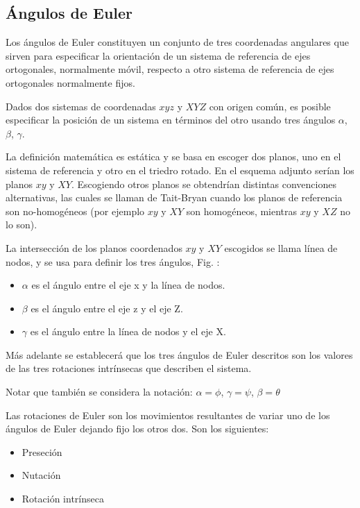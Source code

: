 \subsection{Ángulos de Euler}


Los ángulos de Euler constituyen un conjunto de tres coordenadas angulares que
sirven para especificar la orientación de un sistema de referencia de ejes
ortogonales, normalmente móvil, respecto a otro sistema de referencia de ejes
ortogonales normalmente fijos.

Dados dos sistemas de coordenadas $xyz$ y $XYZ$ con origen común, es posible
especificar la posición de un sistema en términos del otro usando tres ángulos
$\alpha$, $\beta$, $\gamma$.

La definición matemática es estática y se basa en escoger dos planos, uno en el
sistema de referencia y otro en el triedro rotado. En el esquema adjunto serían
los planos $xy$ y $XY$. Escogiendo otros planos se obtendrían distintas convenciones
alternativas, las cuales se llaman de Tait-Bryan cuando los planos de referencia
son no-homogéneos (por ejemplo $xy$ y $XY$ son homogéneos, mientras $xy$ y $XZ$ no lo
son).

La intersección de los planos coordenados $xy$ y $XY$ escogidos se llama línea de
nodos, y se usa para definir los tres ángulos, Fig. :

\begin{itemize}
    \item $\alpha$ es el ángulo entre el eje x y la línea de nodos.
    \item $\beta$  es el ángulo entre el eje z y el eje Z.
    \item $\gamma$  es el ángulo entre la línea de nodos y el eje X.
\end{itemize}

Más adelante se establecerá que los tres ángulos de Euler descritos son los
valores de las tres rotaciones intrínsecas que describen el sistema.

Notar que también se considera la notación: $\alpha =\phi$, $\gamma =\psi$,
$\beta =\theta$

Las rotaciones de Euler son los movimientos resultantes de variar uno de los
ángulos de Euler dejando fijo los otros dos. Son los siguientes:

\begin{itemize}
    \item Preseción
    \item Nutación
    \item Rotación intrínseca
\end{itemize}

